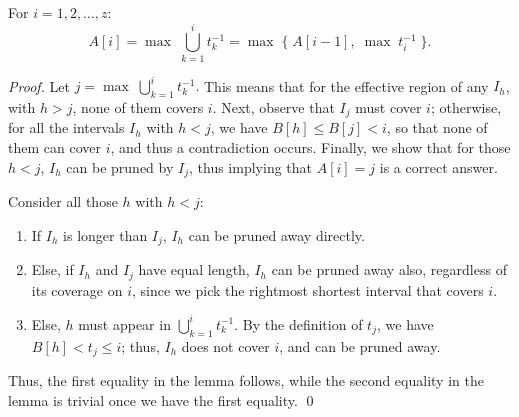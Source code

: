\documentclass[11pt]{llncs}
\newcommand{\remove}[1]{}
\begin{document}
\begin{lemma}
\label{lem:b}
For $i = 1,2,\ldots, z$:
\[A[i] = \max\; \bigcup_{k=1}^i t_k^{-1} = \max\; 
\{\; A[i-1],\; \max\; t_i^{-1}\; \}.\]
\end{lemma}
\begin{proof}
  Let $j = \max\; \bigcup_{k=1}^i t_k^{-1}.$ This means that for the
  effective region of any $I_h$, with $h > j$, none of them covers
  $i$.  Next, observe that $I_j$ must cover $i$; otherwise, for all
  the intervals $I_h$ with $h < j$, we have $B[h] \leq B[j] < i$, so
  that none of them can cover $i$, and thus a contradiction occurs.
Finally, we show that for those $h < j$, $I_h$ can be
    pruned by $I_j$, thus implying that $A[i] = j$ is a correct
    answer.

\medskip

\noindent
Consider all those $h$ with $h < j$:  
\begin{enumerate}
\item If $I_h$ is longer than $I_j$, $I_h$ can be pruned away
  directly.

\item Else, if $I_h$ and $I_j$ have equal length, $I_h$ can be pruned
  away also, regardless of its coverage on $i$,
since we pick the rightmost shortest interval that covers
  $i$.

\item Else, $h$ must appear in $\bigcup_{k=1}^i t_k^{-1}$. By the
  definition of $t_j$, we have $B[h] < t_j \leq i$; thus, $I_h$ does
  not cover $i$, and can be pruned away.
\end{enumerate}
\remove{
\begin{enumerate}
\item If $I_h$ is no shorter than $I_j$, $I_h$ can be pruned away
  directly.

\item Else, if $h$ appears in $\bigcup_{k=1}^i t_k^{-1}$, by the
  definition of $t_j$, we have $B[h] < t_j \leq i$; thus. $I_h$ does
  not cover $i$, and can be pruned away.

\item Else, $h$ does not appear in $\bigcup_{k=1}^i t_k^{-1}$.  Then,
  we have $t_h > i$, so that the effective region of $I_h$ does not
  cover $i$; so $I_h$ can be pruned away.
\end{enumerate}
}
Thus, the first equality in the lemma follows, while the second
equality in the lemma is trivial once we have the first equality. 
\qed 
\end{proof}
\end{document}

